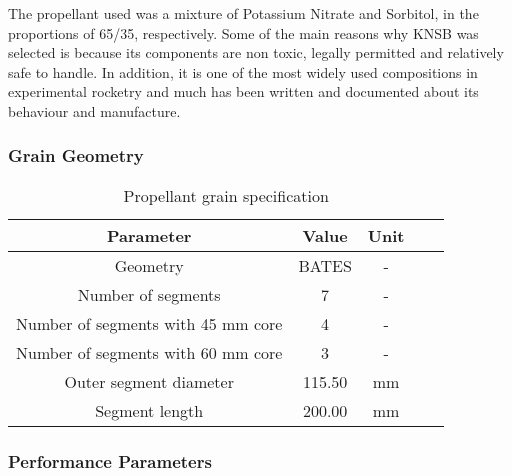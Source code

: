 \documentclass[journal]{new-aiaa}
\begin{document}
The propellant used was a mixture of Potassium Nitrate and Sorbitol, in the proportions of 65/35, respectively. Some of the main reasons why KNSB was selected is because its components are non toxic, legally permitted and relatively safe to handle. In addition, it is one of the most widely used compositions in experimental rocketry and much has been written and documented about its behaviour and manufacture.

\subsubsection{Grain Geometry}

\begin{table}[H]
    \centering
    \caption{Propellant grain specification}
    \begin{tabular}{|c|c|c|c|c|}
        \hline
        \textbf{Parameter} & \textbf{Value} & \textbf{Unit} \\
        \hline
        Geometry & BATES & - \\ \hline
        Number of segments & 7 & - \\ \hline
        Number of segments with 45 mm core & 4 & - \\ \hline
        Number of segments with 60 mm core & 3 & - \\ \hline
        Outer segment diameter & 115.50 & mm \\ \hline
        Segment length & 200.00 & mm \\ \hline
    \end{tabular}
    \label{tab:ib-specification}
\end{table}

\subsubsection{Performance Parameters}
\end{document}
